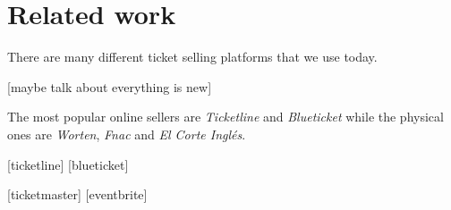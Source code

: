 \section{Related work}

There are many different ticket selling platforms that we use today.

    [maybe talk about everything is new]

The most popular online sellers are \emph{Ticketline} and \emph{Blueticket} while the physical ones are \emph{Worten}, \emph{Fnac} and \emph{El Corte Inglés}.

[ticketline]
[blueticket]

[ticketmaster]
[eventbrite]